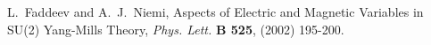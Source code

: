 \documentclass[12pt]{article}
\begin{document}
\begin{thebibliography}{99}
	L.~Faddeev and A.~J.~Niemi, Aspects of Electric and Magnetic 
	Variables in SU(2) Yang-Mills Theory,
	{\it Phys. Lett.} {\bf B 525}, (2002) 195-200.



\end{thebibliography}
\end{document}
